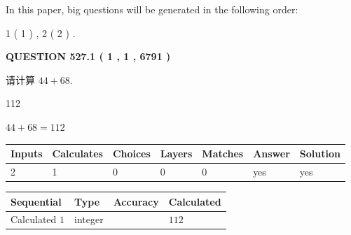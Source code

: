 \documentclass{ctexart}
\begin{document}
In this paper, big questions will be generated in the following order: 
   
   
   1 ( 1 )
 ,
   2 ( 2 )
 .
  
\vspace{0.2in}
  
{\textbf{\Large{QUESTION
527.1 
 ( 1 , 1 , 6791 )
}}}
  
  
 
请计算 $ %
44 +  %
68 $.
 
 
 
\noindent{}
 
 

112
 
 
\noindent{}
 
 

 
 
 
\noindent{}
 
 

$ %
44 +  %
68=   %
112$
 
 
\noindent{}
 
 

 
   
   
   
   
\noindent\begin{tabular}{|l|l|l|l|l|l|l|}
 \hline
Inputs & Calculates & Choices & Layers & Matches & Answer & Solution \\ \hline
 2  & 
 1  & 
 0
  & 
 0  & 
 0  & 
  yes & 
  yes 
  \\ \hline
 \end{tabular}
   
   
   
   
\noindent{}
   
   
  
  
\noindent\begin{tabular}{|l|l|l|l|}
\hline
 Sequential & Type & Accuracy & Calculated \\ 
\hline
 
 
  Calculated $  1 $ & integer &  & 
  $ 112 $ 
 \\  \hline  
 \end{tabular}
   
\end{document}
